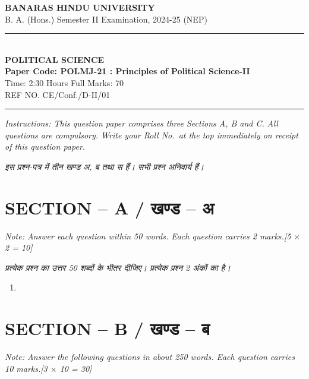 \documentclass[11pt,a4paper]{article}
\newcommand{\pts}[1]{\hfill \textit{[#1]}}
\begin{document}
\begin{center}
  {\large\bfseries BANARAS HINDU UNIVERSITY}\\[2pt]
  {\normalsize B. A. (Hons.) Semester II Examination, 2024-25 (NEP)}\\[6pt]
  \rule{0.8\linewidth}{0.5pt}\\[6pt]
  {\large\bfseries POLITICAL SCIENCE}\\[4pt]
  {\large\bfseries Paper Code: POLMJ-21 : Principles of Political Science-II}\\[4pt]
  {\normalsize Time: 2:30 Hours \hfill Full Marks: 70}\\[2pt]
  {\small REF NO. CE/Conf./D-II/01}
\end{center}
\rule{\linewidth}{0.4pt}
\smallskip

\noindent \textit{Instructions: This question paper comprises three Sections A, B and C. All questions are compulsory. Write your Roll No.\ at the top immediately on receipt of this question paper.}

\smallskip
\noindent \textit{इस प्रश्न-पत्र में तीन खण्ड अ, ब तथा स हैं। सभी प्रश्न अनिवार्य हैं।}

\bigskip

\section*{SECTION -- A / खण्ड -- अ}
\noindent \textit{Note: Answer each question within 50 words. Each question carries 2 marks.}\pts{5 $\times$ 2 = 10}

\noindent \textit{प्रत्येक प्रश्न का उत्तर 50 शब्दों के भीतर दीजिए। प्रत्येक प्रश्न 2 अंकों का है।}

\begin{enumerate}[label=\textbf{\arabic*.},leftmargin=*,itemsep=8pt]
  \item 
\end{enumerate}

\bigskip

\section*{SECTION -- B / खण्ड -- ब}
\noindent \textit{Note: Answer the following questions in about 250 words. Each question carries 10 marks.}\pts{3 $\times$ 10 = 30}
\end{document}
